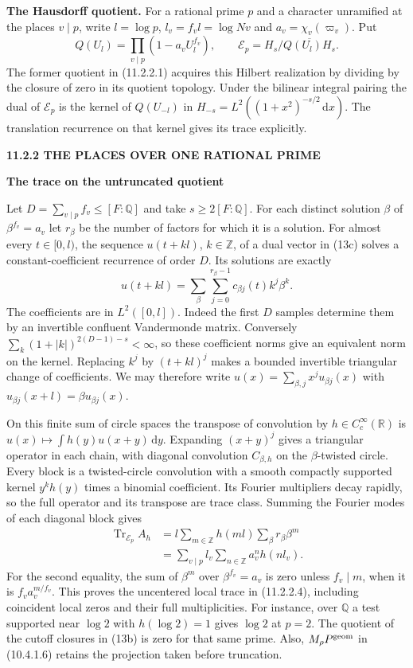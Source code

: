 \documentclass[11pt,letterpaper]{article}
\newcommand{\rightmarktext}{}
\newcommand{\printfolio}{}
\newcommand{\leaf}[4]{\clearpage\gdef\printfolio{#1}\gdef\rightmarktext{#2}%
  {\small\sffamily\bfseries\color{ink}#3\par}\vspace{3pt}%
  {\LARGE\bfseries #4\par}\vspace{5pt}}
\newcommand{\point}[1]{\par\smallskip\textbf{#1.}\enspace\ignorespaces}
\newcommand{\R}{\mathbb R}
\newcommand{\Q}{\mathbb Q}
\newcommand{\Z}{\mathbb Z}
\newcommand{\dd}{\,\mathrm d}
\DeclareMathOperator{\Tr}{Tr}
\begin{document}
\point{The Hausdorff quotient} For a rational prime $p$ and a character
unramified at the places $v\mid p$, write $l=\log p$,
$l_v=f_v l=\log Nv$ and $a_v=\chi_v(\varpi_v)$. Put
\[
 Q(U_l)=\prod_{v\mid p}(1-a_vU_l^{f_v}),\qquad
 \mathcal E_p=H_s/\overline{Q(U_l)H_s}.
 \tag{13c}
\]
The former quotient in (11.2.2.1) acquires this Hilbert realization
by dividing by the closure of zero in its quotient topology.
Under the bilinear integral pairing the dual of $\mathcal E_p$ is the
kernel of $Q(U_{-l})$ in $H_{-s}=L^2((1+x^2)^{-s/2}\dd x)$.
The translation recurrence on that kernel gives its trace explicitly.

\leaf{484b}{The local Hilbert quotient}{11.2.2 \quad THE PLACES OVER ONE RATIONAL PRIME}{The trace on the untruncated quotient}
Let $D=\sum_{v\mid p}f_v\le[F:\Q]$ and take $s\ge2[F:\Q]$.
For each distinct solution $\beta$ of $\beta^{f_v}=a_v$ let
$r_\beta$ be the number of factors for which it is a solution.
For almost every $t\in[0,l)$, the sequence $u(t+kl)$, $k\in\Z$, of a
dual vector in (13c) solves a constant-coefficient recurrence of order
$D$. Its solutions are exactly
\[
   u(t+kl)=\sum_\beta\sum_{j=0}^{r_\beta-1}
                              c_{\beta j}(t)k^j\beta^k .
\]
The coefficients are in $L^2([0,l])$. Indeed the first $D$ samples
determine them by an invertible confluent Vandermonde matrix. Conversely
$\sum_k(1+|k|)^{2(D-1)-s}<\infty$, so these coefficient norms give
an equivalent norm on the kernel. Replacing $k^j$ by $(t+kl)^j$ makes
a bounded invertible triangular change of coefficients. We may therefore
write $u(x)=\sum_{\beta,j}x^j u_{\beta j}(x)$ with
$u_{\beta j}(x+l)=\beta u_{\beta j}(x)$.

On this finite sum of circle spaces the transpose of convolution by
$h\in C_c^\infty(\R)$ is $u(x)\mapsto\int h(y)u(x+y)\dd y$.
Expanding $(x+y)^j$ gives a triangular operator in each chain, with
diagonal convolution $C_{\beta,h}$ on the $\beta$-twisted circle.
Every block is a twisted-circle convolution with a smooth compactly
supported kernel $y^k h(y)$ times a binomial coefficient. Its Fourier
multipliers decay rapidly, so the full operator and its transpose are
trace class. Summing the Fourier modes of each diagonal block gives
\[
 \begin{aligned}
 \Tr_{\mathcal E_p} A_h
  &= l\sum_{m\in\Z}h(ml)\sum_\beta r_\beta\beta^m\\
  &= \sum_{v\mid p} l_v\sum_{n\in\Z}a_v^n h(nl_v).
 \end{aligned}
 \tag{13d}
\]
For the second equality, the sum of $\beta^m$ over $\beta^{f_v}=a_v$
is zero unless $f_v\mid m$, when it is $f_v a_v^{m/f_v}$.
This proves the uncentered local trace in (11.2.2.4), including
coincident local zeros and their full multiplicities. For instance,
over $\Q$ a test supported near $\log 2$ with $h(\log 2)=1$ gives
$\log 2$ at $p=2$. The quotient of the cutoff closures in (13b) is zero
for that same prime. Also, $M_\rho P^{\rm geom}$ in (10.4.1.6)
retains the projection taken before truncation.
\end{document}

